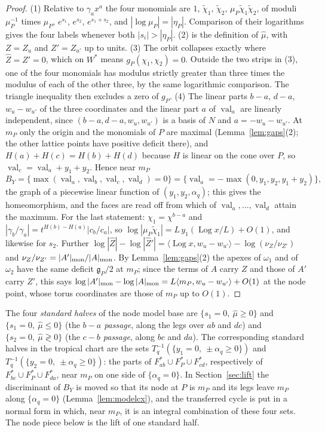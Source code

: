 \begin{proof}
(1) Relative to $\gamma_ax^a$ the four monomials are $1$, $\tilde\chi_1$, $\tilde\chi_2$, $\mu_P\tilde\chi_1\tilde\chi_2$, of
moduli $\mu_P^{-1}$ times $\mu_P$, $e^{s_1}$, $e^{s_2}$, $e^{s_1+s_2}$, and $|\log\mu_P|=|\eta_P|$.
Comparison of their logarithms gives the four labels whenever both $|s_i|>|\eta_P|$.
(2) is the definition of
$\hat\mu$, with $Z=Z_u$ and $Z'=Z_{u'}$ up to units. (3) The orbit collapses exactly where $\hat Z=\hat Z'=0$, which on
$W^*$ means $g_P(\chi_1,\chi_2)=0$. Outside the two strips in (3), one of the four monomials has modulus
strictly greater than three times the modulus of each of the other three, by the same logarithmic comparison.
The triangle inequality then excludes a zero of $g_P$.
(4) The linear parts $b-a$,
$d-a$, $w_u-w_{u'}$ of the three coordinates and the linear part $a$ of $\operatorname{val}_a$ are linearly independent,
since $(b-a,d-a,w_u,w_{u'})$ is a basis of $N$ and $a=-w_u-w_{u'}$. At $m_P$ only the origin and the monomials of $P$ are
maximal (Lemma~\ref{lem:gaps}(2); the other lattice points have positive deficit there), and $H(a)+H(c)=H(b)+H(d)$
because $H$ is linear on the cone over $P$, so $\operatorname{val}_c=\operatorname{val}_a+y_1+y_2$. Hence near $m_P$
\[
B_Y=\{\max(\operatorname{val}_a,\operatorname{val}_b,\operatorname{val}_c,\operatorname{val}_d)=0\}
=\{\operatorname{val}_a=-\max(0,y_1,y_2,y_1+y_2)\},
\]
the graph of a piecewise linear function of $(y_1,y_2,\alpha_q)$; this gives the homeomorphism, and the faces are read
off from which of $\operatorname{val}_a,\dots,\operatorname{val}_d$ attain the maximum. For the last statement:
$\chi_1=\chi^{b-a}$ and $|\gamma_b/\gamma_a|=t^{H(b)-H(a)}|c_b/c_a|$, so
$\log|\mu_P\tilde\chi_1|=L\,y_1(\operatorname{Log}x/L)+O(1)$, and likewise for $s_2$. Further
$\log|\hat Z|-\log|\hat Z'|=\langle\operatorname{Log}x,w_u-w_{u'}\rangle-\log(\nu_Z/\nu_{Z'})$ and
$\nu_Z/\nu_{Z'}=|A'|_{\rm mon}/|A|_{\rm mon}$. By Lemma~\ref{lem:gaps}(2) the apexes of $\omega_1$ and of $\omega_2$ have the
same deficit $\mathfrak g_P/2$ at $m_P$; since the terms of $A$ carry $Z$ and those of $A'$ carry $Z'$, this says
$\log|A'|_{\rm mon}-\log|A|_{\rm mon}=L\langle m_P,w_u-w_{u'}\rangle+O(1)$ at the node point, whose torus coordinates are
those of $m_P$ up to $O(1)$.
\end{proof}

The four \emph{standard halves} of the node model base are $\{s_1=0,\ \hat\mu\ge0\}$ and $\{s_1=0,\ \hat\mu\le0\}$ (the
\emph{$b-a$ passage}, along the legs over $ab$ and $dc$) and $\{s_2=0,\ \hat\mu\gtrless0\}$ (the \emph{$c-b$ passage},
along $bc$ and $da$). The corresponding standard halves in the tropical chart are the sets
$T_q^{-1}(\{y_1=0,\ \pm\alpha_q\ge0\})$ and
$T_q^{-1}(\{y_2=0,\ \pm\alpha_q\ge0\})$: the parts of $F^*_{ab}\cup F^*_P\cup F^*_{cd}$, respectively of
$F^*_{bc}\cup F^*_P\cup F^*_{da}$, near $m_P$ on one side of $\{\alpha_q=0\}$. In Section~\ref{sec:lift} the discriminant
of $B_Y$ is moved so that its node at $P$ is $m_P$ and its legs leave $m_P$ along $\{\alpha_q=0\}$
(Lemma~\ref{lem:modelcx}), and the transferred cycle is put in a normal form in which, near $m_P$, it is an integral
combination of these four sets. The node piece below is the lift of one standard half.

